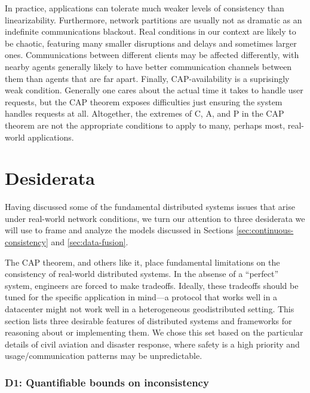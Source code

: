 \documentclass[]             %
{NASA}                       %
\theoremstyle{definition}
\begin{document}
In practice, applications can tolerate much weaker levels of consistency
than linearizability. Furthermore, network partitions are usually not as
dramatic as an indefinite communications blackout. Real conditions in
our context are likely to be chaotic, featuring many smaller disruptions
and delays and sometimes larger ones. Communications between different
clients may be affected differently, with nearby agents generally likely
to have better communication channels between them than agents that are
far apart. Finally, CAP-availability is a suprisingly weak condition.
Generally one cares about the actual time it takes to handle user
requests, but the CAP theorem exposes difficulties just ensuring the
system handles requests at all. Altogether, the extremes of C, A, and P
in the CAP theorem are not the appropriate conditions to apply to many,
perhaps most, real-world applications.

\newpage

\hypertarget{desiderata}{%
\section{Desiderata}\label{desiderata}}

\label{sec:desiderata}

Having discussed some of the fundamental distributed systems issues that
arise under real-world network conditions, we turn our attention to
three desiderata we will use to frame and analyze the models discussed
in Sections \ref{sec:continuous-consistency} and \ref{sec:data-fusion}.

The CAP theorem, and others like it, place fundamental limitations on
the consistency of real-world distributed systems. In the absense of a
``perfect'' system, engineers are forced to make tradeoffs. Ideally,
these tradeoffs should be tuned for the specific application in mind---a
protocol that works well in a datacenter might not work well in a
heterogeneous geodistributed setting. This section lists three desirable
features of distributed systems and frameworks for reasoning about or
implementing them. We chose this set based on the particular details of
civil aviation and disaster response, where safety is a high priority
and usage/communication patterns may be unpredictable.

\hypertarget{d1-quantifiable-bounds-on-inconsistency}{%
\subsubsection{D1: Quantifiable bounds on
inconsistency}\label{d1-quantifiable-bounds-on-inconsistency}}
\end{document}
